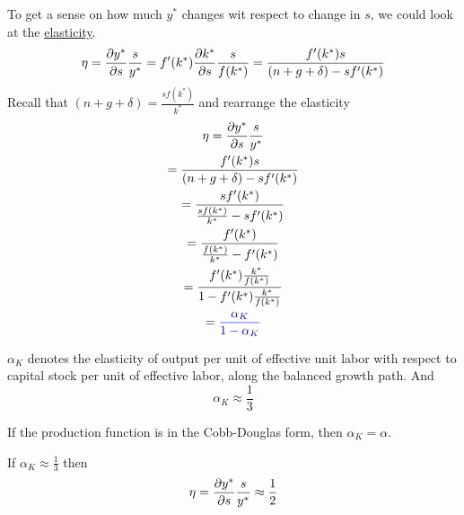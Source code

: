 \documentclass[]{article}
\begin{document}
			\par To get a sense on how much $y^*$ changes wit respect to change in $s$, we could look at the \ul{elasticity}.
			\[
				\eta = \frac{\partial{y^*}}{\partial{s}}\frac{s}{y^*} = f'(k^*) \frac{\partial{k^*}}{\partial{s}} \frac{s}{f(k^*)} = \frac{f'(k^*)s}{(n+g+\delta) - sf'(k^*)}
			\]
			Recall that $(n+g+\delta) = \frac{sf(k^*)}{k^*}$ and rearrange the elasticity
			\begin{gather*}
				\eta = \frac{\partial{y^*}}{\partial{s}}\frac{s}{y^*} \\
				= \frac{f'(k^*)s}{(n+g+\delta) - sf'(k^*)} \\
				= \frac{s f'(k^*)}{\frac{s f(k^*)}{k^*} - sf'(k^*)} \\
				= \frac{f'(k^*)}{\frac{f(k^*)}{k^*} - f'(k^*)} \\
				= \frac{f'(k^*) \frac{k^*}{f(k^*)}}{1 - f'(k^*)\frac{k^*}{f(k^*)}} \\
				= \textcolor{blue}{
					\frac{\alpha_K}{1 - \alpha_K}
					} \\
			\end{gather*}
			
			\begin{remark}
				$\alpha_K$ denotes the elasticity of output per unit of effective unit labor with respect to capital stock per unit of effective labor, along the balanced growth path. And
				\[
					\alpha_K \approx \frac{1}{3}
				\]
			\end{remark}
			
			\begin{remark}
				If the production function is in the Cobb-Douglas form, then $\alpha_K = \alpha$.
			\end{remark}
			
			\begin{example}
				If $\alpha_K \approx \frac{1}{3}$ then \[\eta = \frac{\partial{y^*}}{\partial{s}} \frac{s}{y^*} \approx \frac{1}{2}\]
			\end{example}
			
\end{document}
